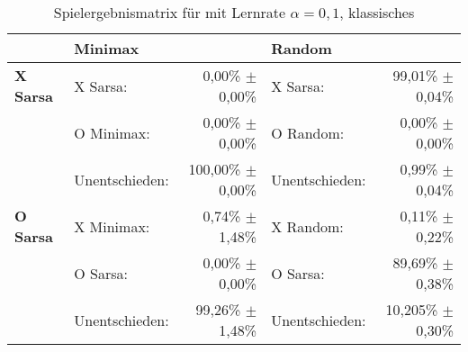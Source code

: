 \begin{table}
\centering
\caption[Spielergebnismatrix \sarsa: $\alpha=0,1$, klassisches \splay]{Spielergebnismatrix für \sarsa mit Lernrate $\alpha=0,1$, klassisches \splay}
\label{tab:resultmatrix_sarsa_normal_alpha01}

\begin{tabular}{llrlr}
\toprule
 & \multicolumn{2}{l}{\textbf{Minimax}} & \multicolumn{2}{l}{\textbf{Random}} \\ \midrule
\textbf{X Sarsa}        & X Sarsa:          & 0,00\% $\pm$    0,00\%            & X Sarsa:              & 99,01\% $\pm$ 0,04\%  \\
                        & O Minimax:        & 0,00\% $\pm$    0,00\%            & O Random:            & 0,00\% $\pm$ 0,00\%  \\
                        & Unentschieden:    & 100,00\% $\pm$  0,00\%            & Unentschieden:        & 0,99\% $\pm$ 0,04\%  \\ \cmidrule{2-5}
\textbf{O Sarsa}        & X Minimax:        & 0,74\% $\pm$    1,48\%            & X Random:             & 0,11\% $\pm$ 0,22\%  \\
                        & O Sarsa:          & 0,00\% $\pm$    0,00\%            & O Sarsa:              & 89,69\% $\pm$ 0,38\%  \\
                        & Unentschieden:    & 99,26\% $\pm$  1,48\%             & Unentschieden:        & 10,205\% $\pm$ 0,30\%  \\ \bottomrule
\end{tabular}
\end{table}